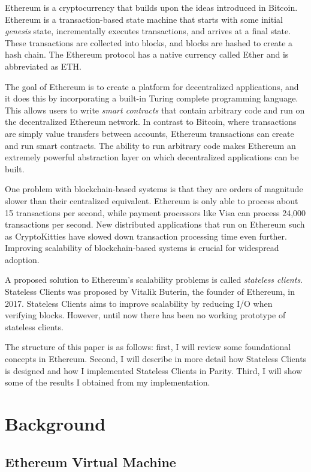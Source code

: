\documentclass[12pt]{article}
\newcounter{protocol}
\begin{document}
Ethereum is a cryptocurrency that builds upon the ideas introduced in Bitcoin. Ethereum is a transaction-based state machine that starts with some initial \emph{genesis} state, incrementally executes transactions, and arrives at a final state. These transactions are collected into blocks, and blocks are hashed to create a hash chain. The Ethereum protocol has a native currency called Ether and is abbreviated as ETH.

The goal of Ethereum is to create a platform for decentralized applications, and it does this by incorporating a built-in Turing complete programming language. This allows users to write \emph{smart contracts} that contain arbitrary code and run on the decentralized Ethereum network. In contrast to Bitcoin, where transactions are simply value transfers between accounts, Ethereum transactions can create and run smart contracts. The ability to run arbitrary code makes Ethereum an extremely powerful abstraction layer on which decentralized applications can be built.

One problem with blockchain-based systems is that they are orders of magnitude slower than their centralized equivalent. Ethereum is only able to process about 15 transactions per second, while payment processors like Visa can process 24,000 transactions per second. New distributed applications that run on Ethereum such as CryptoKitties have slowed down transaction processing time even further. Improving scalability of blockchain-based systems is crucial for widespread adoption.

A proposed solution to Ethereum's scalability problems is called \emph{stateless clients}. Stateless Clients was proposed by Vitalik Buterin, the founder of Ethereum, in 2017. Stateless Clients aims to improve scalability by reducing I/O when verifying blocks. However, until now there has been no working prototype of stateless clients.

The structure of this paper is as follows: first, I will review some foundational concepts in Ethereum. Second, I will describe in more detail how Stateless Clients is designed and how I implemented Stateless Clients in Parity. Third, I will show some of the results I obtained from my implementation.

\section{Background}

\subsection{Ethereum Virtual Machine}
\end{document}
